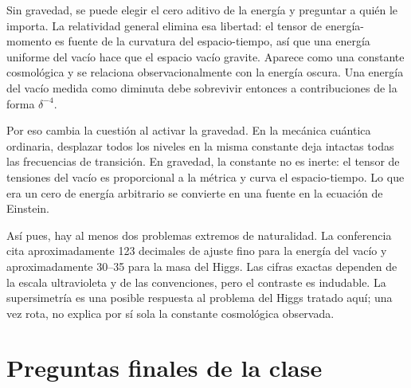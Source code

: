 Sin gravedad, se puede elegir el cero aditivo de la energía y preguntar a quién le importa. La relatividad general elimina esa libertad: el tensor de energía-momento es fuente de la curvatura del espacio-tiempo, así que una energía uniforme del vacío hace que el espacio vacío gravite. Aparece como una constante cosmológica y se relaciona observacionalmente con la energía oscura. Una energía del vacío medida como diminuta debe sobrevivir entonces a contribuciones de la forma \(\delta^{-4}\).

Por eso cambia la cuestión al activar la gravedad. En la mecánica cuántica ordinaria, desplazar todos los niveles en la misma constante deja intactas todas las frecuencias de transición. En gravedad, la constante no es inerte: el tensor de tensiones del vacío es proporcional a la métrica y curva el espacio-tiempo. Lo que era un cero de energía arbitrario se convierte en una fuente en la ecuación de Einstein.

Así pues, hay al menos dos problemas extremos de naturalidad. La conferencia cita aproximadamente 123 decimales de ajuste fino para la energía del vacío y aproximadamente 30--35 para la masa del Higgs. Las cifras exactas dependen de la escala ultravioleta y de las convenciones, pero el contraste es indudable. La supersimetría es una posible respuesta al problema del Higgs tratado aquí; una vez rota, no explica por sí sola la constante cosmológica observada.

\section{Preguntas finales de la clase}

\begin{classroomqa}
\end{classroomqa}

